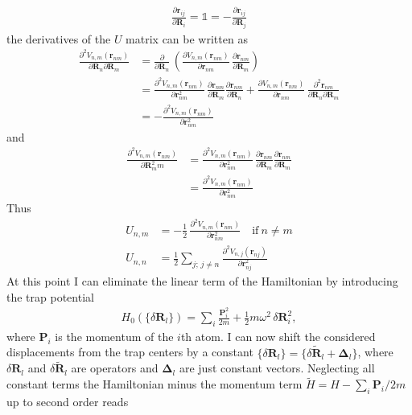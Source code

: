 \begin{align*}
    \frac{\partial \mathbf{r}_{ij}}{\partial \mathbf{R}_i}=\mathbb{1}=-\frac{\partial \mathbf{r}_{ij}}{\partial \mathbf{R}_j}
\end{align*}
the derivatives of the $U$ matrix can be written as 
\begin{align*}
    \frac{\partial^2 V_{n,m}(\mathbf{r}_{nm})}{\partial \mathbf{R}_n\partial\mathbf{R}_m}&=\frac{\partial}{\partial  \mathbf{R}_n }\,\left( \frac{\partial V_{n,m}(\mathbf{r}_{nm})}{\partial\mathbf{r}_{nm}}\,  \frac{\partial \mathbf{r}_{nm}}{\partial\mathbf{R}_{m}}\right)\\
    &= \frac{\partial^2 V_{n,m}(\mathbf{r}_{nm})}{\partial\mathbf{r}_{nm}^2}\,  \frac{\partial \mathbf{r}_{nm}}{\partial\mathbf{R}_{m}}\frac{\partial \mathbf{r}_{nm}}{\partial\mathbf{R}_{n}}+\frac{\partial V_{n,m}(\mathbf{r}_{nm})}{\partial\mathbf{r}_{nm}}\,  \frac{\partial^2 \mathbf{r}_{nm}}{\partial\mathbf{R}_{n}\partial\mathbf{R}_{m}}\\
    &=-\frac{\partial^2 V_{n,m}(\mathbf{r}_{nm})}{\partial\mathbf{r}_{nm}^2}
\end{align*}
and
\begin{align*}
    \frac{\partial^2 V_{n,m}(\mathbf{r}_{nm})}{\partial \mathbf{R}_m^2m}
    &= \frac{\partial^2 V_{n,m}(\mathbf{r}_{nm})}{\partial\mathbf{r}_{nm}^2}\,  \frac{\partial \mathbf{r}_{nm}}{\partial\mathbf{R}_{m}}\frac{\partial \mathbf{r}_{nm}}{\partial\mathbf{R}_{m}}\\
    &=\frac{\partial^2 V_{n,m}(\mathbf{r}_{nm})}{\partial\mathbf{r}_{nm}^2}
\end{align*}
Thus
\begin{align*}
    U_{n,m}&=
        -\frac12\,\frac{\partial^2 V_{n,m}(\mathbf{r}_{nm})}{\partial\mathbf{r}_{nm}^2}\quad\text{if}\:n\neq m\\
    U_{n,n} &= \frac12\sum_{j;\,j\neq n}\frac{\partial^2 V_{n,j}(\mathbf{r}_{nj})}{\partial\mathbf{r}_{nj}^2}
\end{align*}
At this point I can eliminate the linear term of the Hamiltonian by introducing the trap potential 
\begin{align*}
    H_0(\{\delta\mathbf{R}_l\}) = \sum_i\frac{\mathbf{P}_i^2}{2m}+ \frac12 m \omega^2 \,\delta\mathbf{R}_i^2,
\end{align*}
where $\mathbf{P}_i$ is the momentum of the $i$th atom. I can now shift the considered displacements from the trap centers by a constant $\{\delta\mathbf{R}_l\}=\{\delta\tilde{\mathbf{R}}_l+\mathbf{\Delta}_l\}$, where $\delta\mathbf{R}_l$ and $\delta\tilde{\mathbf{R}}_l$ are operators and $\mathbf{\Delta}_l$ are just constant vectors. Neglecting all constant terms the Hamiltonian minus the momentum term $\tilde{H}=H-\sum_i\mathbf{P}_i/2m$ up to second order reads
